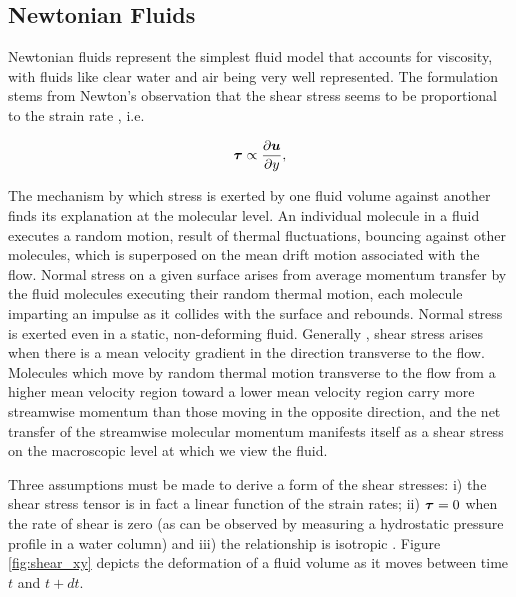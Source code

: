 \subsection{Newtonian Fluids}
\label{subsec:newtonian fluids}

Newtonian fluids represent the simplest fluid model that accounts for viscosity, with fluids like clear water and air being very well represented. The formulation stems from Newton's observation that the shear stress seems to be proportional to the strain rate \citep{Batchelor-2000}, i.e.

%
	\begin{equation} \label{eq:newtonian_fluid_I}
		\boldsymbol{\tau} \propto \frac{\partial \boldsymbol{u}}{\partial y},
	\end{equation}
%

The mechanism by which stress is exerted by one fluid volume against another finds its explanation at the molecular level. An individual molecule in a fluid executes a random motion, result of thermal fluctuations, bouncing against other molecules, which is superposed on the mean drift motion associated with the flow. Normal stress on a given surface arises from average momentum transfer by the fluid molecules executing their random thermal motion, each molecule imparting an impulse as it collides with the surface and rebounds. Normal stress is exerted even in a static, non-deforming fluid. Generally , shear stress arises when there is a mean velocity gradient in the direction transverse to the flow. Molecules which move by random thermal motion transverse to the flow from a higher mean velocity region toward a lower mean velocity region carry more streamwise momentum than those moving in the opposite direction, and the net transfer of the streamwise molecular momentum manifests itself as a shear stress on the macroscopic level at which we view the fluid.

Three assumptions must be made to derive a form of the shear stresses: i) the shear stress tensor is in fact a linear function of the strain rates; ii) $\boldsymbol{\tau}=0$ when the rate of shear is zero (as can be observed by measuring a hydrostatic pressure profile in a water column) and iii) the relationship is isotropic \citep{Batchelor-2000}. Figure \ref{fig:shear_xy} depicts the deformation of a fluid volume as it moves between time $t$ and $t+dt$. 

